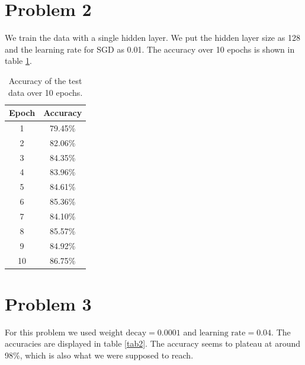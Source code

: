 \documentclass[a4paper]{article}
\begin{document}
\section*{Problem 2}
We train the data with a single hidden layer. We put the hidden layer size as 128 and the learning rate for SGD as 0.01. The accuracy over 10 epochs is shown in table \ref{tab}.
\begin{table}[H]
	\centering
	
	\begin{tabular}{|c|c|}
		\hline
		Epoch & Accuracy \\
		\hline
		1 & 79.45\% \\
		\hline
		2 & 82.06\% \\
		\hline
		3 &  84.35\%\\
		\hline
		4 &  83.96\%\\
		\hline
		5 &  84.61\%\\
		\hline
		6 &  85.36\%\\
		\hline
		7 &  84.10\%\\
		\hline
		8 &  85.57\%\\
		\hline
		9 &  84.92\%\\
		\hline
		10 &  86.75\%\\
		\hline
	\end{tabular}
	\caption{Accuracy of the test data over 10 epochs. }
	\label{tab}
\end{table}

\section*{Problem 3}
For this problem we used $\text{weight decay}  = 0.0001$ and
$\text{learning rate} = 0.04$. The accuracies are displayed in table \ref{tab2}. The accuracy seems to plateau at around 98\%, which is also what we were supposed to reach.
\end{document}
